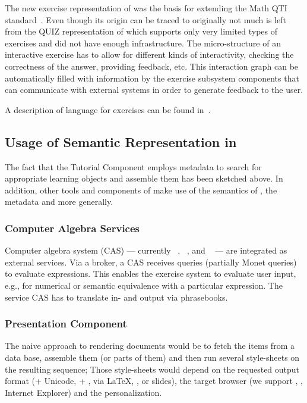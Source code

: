 The new exercise representation of {\activemath} was the basis for extending the Math QTI
standard~\cite{ENCS04}. Even though its origin can be traced to {\omdoc} originally not
much is left from the QUIZ representation of {\omdoc} which supports only very limited
types of exercises and did not have enough infrastructure.  The micro-structure of an
interactive exercise has to allow for different kinds of interactivity, checking the
correctness of the answer, providing feedback, etc.
This interaction graph can be automatically filled with information  
by the exercise subsystem components that can communicate with external systems in order 
to generate feedback to the user.

A description of {\activemath} language for exercises can be found in~\cite{icce05}.

\subsection{Usage of Semantic Representation in {\activemath}}

The fact that the Tutorial Component employs metadata to search for appropriate learning
objects and assemble them has been sketched above. In addition, other tools and components
of {\activemath} make use of the semantics of {\openmath}, the {\activemath} metadata and
{\omdoc} more generally.

\subsubsection{Computer Algebra Services}
Computer algebra system (CAS) --- currently {}~\cite{URL:Yacas},
{}~\cite{URL:Maxima}, and {}~\cite{URL:wiris-cas} --- are
integrated as external services. Via a broker, a CAS receives queries (partially Monet
queries) to evaluate {\openmath} expressions. This enables the exercise system to evaluate
user input, e.g., for numerical or semantic equivalence with a particular
expression. The service CAS has to translate in- and output via phrasebooks.


\subsubsection{Presentation Component}
The naive approach to rendering {\omdoc} documents would be to fetch the items from a data
base, assemble them (or parts of them) and then run several style-sheets on the resulting
sequence; Those style-sheets would depend on the requested output format (\html + Unicode,
\xhtml + {\mathml}, {\pdf} via {\LaTeX}, {\svg}, or slides), the target browser (we
support {\mozilla}, {\firefox}, Internet Explorer) and the personalization.

